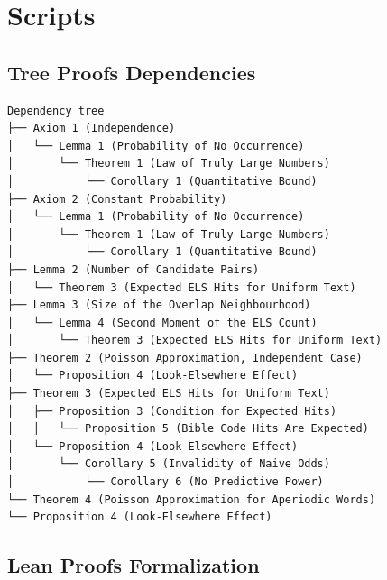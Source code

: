\documentclass[11pt]{amsart}
\theoremstyle{plain}
\theoremstyle{remark}
\begin{document}
\section{Scripts}

\subsection{Tree Proofs Dependencies}
\scriptsize
\begin{verbatim}
Dependency tree
├── Axiom 1 (Independence)
│   └── Lemma 1 (Probability of No Occurrence)
│       └── Theorem 1 (Law of Truly Large Numbers)
│           └── Corollary 1 (Quantitative Bound)
├── Axiom 2 (Constant Probability)
│   └── Lemma 1 (Probability of No Occurrence)
│       └── Theorem 1 (Law of Truly Large Numbers)
│           └── Corollary 1 (Quantitative Bound)
├── Lemma 2 (Number of Candidate Pairs)
│   └── Theorem 3 (Expected ELS Hits for Uniform Text)
├── Lemma 3 (Size of the Overlap Neighbourhood)
│   └── Lemma 4 (Second Moment of the ELS Count)
│       └── Theorem 3 (Expected ELS Hits for Uniform Text)
├── Theorem 2 (Poisson Approximation, Independent Case)
│   └── Proposition 4 (Look-Elsewhere Effect)
├── Theorem 3 (Expected ELS Hits for Uniform Text)
│   ├── Proposition 3 (Condition for Expected Hits)
│   │   └── Proposition 5 (Bible Code Hits Are Expected)
│   └── Proposition 4 (Look-Elsewhere Effect)
│       └── Corollary 5 (Invalidity of Naive Odds)
│           └── Corollary 6 (No Predictive Power)
└── Theorem 4 (Poisson Approximation for Aperiodic Words)
└── Proposition 4 (Look-Elsewhere Effect)
\end{verbatim}
\subsection{Lean Proofs Formalization}
\end{document}
